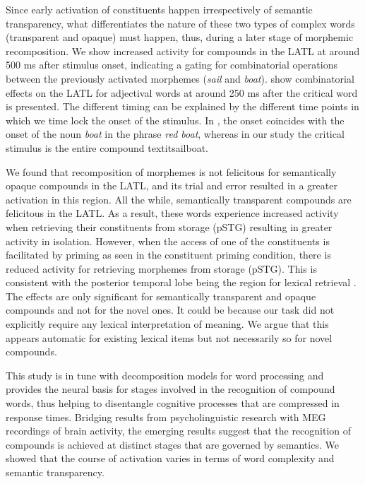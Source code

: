 \documentclass{frontiersSCNS}
\begin{document}
Since early activation of constituents happen irrespectively of semantic transparency, what differentiates the nature of these two types of complex words (transparent and opaque) must happen, thus, during a later stage of morphemic recomposition.   We show increased activity for compounds in the LATL at around 500 ms after stimulus onset, indicating a gating for combinatorial operations between the previously activated morphemes (\textit{sail} and \textit{boat}).  \cite{Bemis:2011} show combinatorial effects on the LATL for adjectival words at around 250 ms after the critical word is presented.  The different timing can be explained by the different time points in which we time lock the onset of the stimulus. In \cite{Bemis:2011}, the onset coincides with the onset of the noun \textit{boat} in the phrase \textit{red boat}, whereas in our study the critical stimulus is the entire compound textit{sailboat}.

We found that recomposition of morphemes is not felicitous for semantically opaque compounds in the LATL,  and its trial and error resulted in a greater activation in this region. All the while, semantically transparent compounds are felicitous in the LATL.  As a result, these words experience increased activity when retrieving their constituents from storage (pSTG) resulting in greater activity in isolation. However, when the access of one of the constituents is facilitated by priming as seen in the constituent priming condition, there is reduced activity for retrieving morphemes from storage (pSTG). This is consistent with the posterior temporal lobe being the region for lexical retrieval \citep{Lau:2008, Hickok:2007}.   
The effects are only significant for semantically transparent and opaque compounds and not for the novel ones.  It could be because our task did not explicitly require any lexical interpretation of meaning. We argue that this appears automatic for existing lexical items but not necessarily so for novel compounds.

This study is in tune with decomposition models for word processing and provides the neural basis for stages involved in the recognition of compound words, thus helping to disentangle cognitive processes that are compressed in response times.  Bridging results from psycholinguistic research with MEG recordings of brain activity, the emerging results suggest that the recognition of compounds is achieved at distinct stages that are governed by semantics. We showed that the course of activation varies in terms of word complexity and semantic transparency. 
\end{document}
